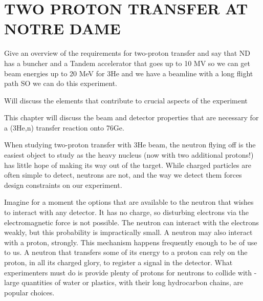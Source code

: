 %
%
%
%
%
%
%
%

%
%

\chapter{TWO PROTON TRANSFER AT NOTRE DAME}
\label{chap:2pExpt}

Give an overview of the requirements for two-proton transfer and say that ND has a buncher and a Tandem accelerator that goes up to 10 MV so we can get beam energies up to 20 MeV for 3He and we have a beamline with a long flight path SO we can do this experiment.

Will discuss the elements that contribute to crucial aspects of the experiment

This chapter will discuss the beam and detector properties that are necessary for a (3He,n) transfer reaction onto 76Ge.

When studying two-proton transfer with 3He beam, the neutron flying off is the easiest object to study as the heavy nucleus (now with two additional protons!) has little hope of making its way out of the target.  While charged particles are often simple to detect, neutrons are not, and the way we detect them forces design constraints on our experiment.

Imagine for a moment the options that are available to the neutron that wishes to interact with any detector.  It has no charge, so disturbing electrons via the electromagnetic force is not possible.  The neutron can interact with the electrons weakly, but this probability is impractically small.  A neutron may also interact with a proton, strongly.  This mechanism happens frequently enough to be of use to us.  A neutron that transfers some of its energy to a proton can rely on the proton, in all its charged glory, to register a signal in the detector.  What experimenters must do is provide plenty of protons for neutrons to collide with - large quantities of water or plastics, with their long hydrocarbon chains, are popular choices.

